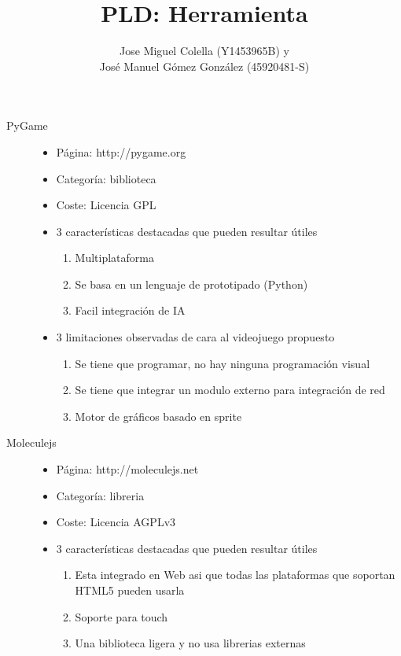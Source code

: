 \documentclass[a4paper]{article}
\title{PLD: Herramienta}
\author{Jose Miguel Colella (Y1453965B) y\\José Manuel Gómez González (45920481-S)}
\begin{document}
\maketitle

\begin{description}
    \item[PyGame]
    \begin{itemize}
        \item Página: http://pygame.org
        \item Categoría: biblioteca
        \item Coste: Licencia GPL
        \item 3 características destacadas que pueden resultar útiles
            \begin{enumerate}
                \item Multiplataforma
                \item Se basa en un lenguaje de prototipado (Python)
                \item Facil integración de IA
            \end{enumerate}
        \item 3 limitaciones observadas de cara al videojuego propuesto
            \begin{enumerate}
                \item Se tiene que programar, no hay ninguna programación visual
                \item Se tiene que integrar un modulo externo para integración de red
                \item Motor de gráficos basado en sprite
            \end{enumerate}
    \end{itemize}
    \item[Moleculejs]
    \begin{itemize}
        \item Página: http://moleculejs.net
        \item Categoría: libreria
        \item Coste: Licencia AGPLv3
        \item 3 características destacadas que pueden resultar útiles
            \begin{enumerate}
                \item Esta integrado en Web asi que todas las plataformas que soportan HTML5 pueden usarla
                \item Soporte para touch
                \item Una biblioteca ligera y no usa librerias externas

\end{enumerate}
\end{itemize}
\end{description}
\end{document}
